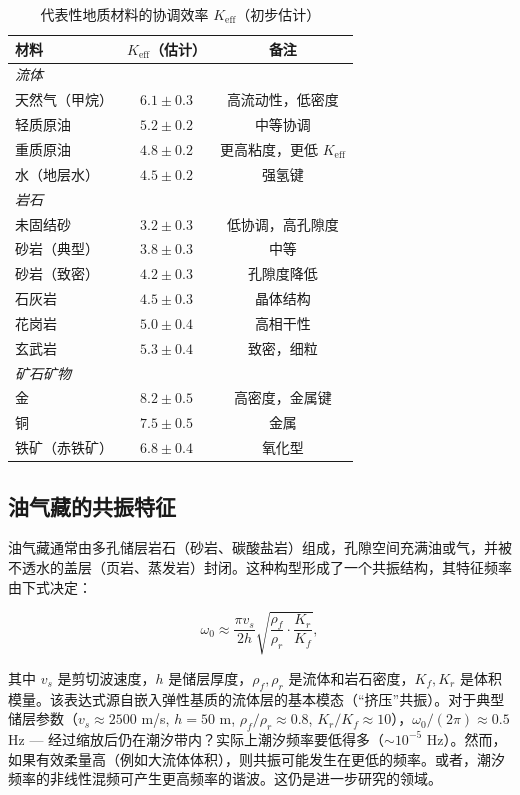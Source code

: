 \documentclass[12pt,a4paper]{article}
\theoremstyle{remark}
\newcommand{\Keff}{K_{\mathrm{eff}}}
\begin{document}
	\begin{table}[htbp]
		\centering
		\caption{代表性地质材料的协调效率 $\Keff$（初步估计）}
		\label{tab:keff-geology}
		\small
		\begin{tabular}{lcc}
			\toprule
			\textbf{材料} & \textbf{$\Keff$（估计）} & \textbf{备注} \\
			\midrule
			\multicolumn{3}{l}{\textit{流体}} \\
			天然气（甲烷） & $6.1 \pm 0.3$ & 高流动性，低密度 \\
			轻质原油 & $5.2 \pm 0.2$ & 中等协调 \\
			重质原油 & $4.8 \pm 0.2$ & 更高粘度，更低 $\Keff$ \\
			水（地层水） & $4.5 \pm 0.2$ & 强氢键 \\
			\hline
			\multicolumn{3}{l}{\textit{岩石}} \\
			未固结砂 & $3.2 \pm 0.3$ & 低协调，高孔隙度 \\
			砂岩（典型） & $3.8 \pm 0.3$ & 中等 \\
			砂岩（致密） & $4.2 \pm 0.3$ & 孔隙度降低 \\
			石灰岩 & $4.5 \pm 0.3$ & 晶体结构 \\
			花岗岩 & $5.0 \pm 0.4$ & 高相干性 \\
			玄武岩 & $5.3 \pm 0.4$ & 致密，细粒 \\
			\hline
			\multicolumn{3}{l}{\textit{矿石矿物}} \\
			金 & $8.2 \pm 0.5$ & 高密度，金属键 \\
			铜 & $7.5 \pm 0.5$ & 金属 \\
			铁矿（赤铁矿） & $6.8 \pm 0.4$ & 氧化型 \\
			\bottomrule
		\end{tabular}
	\end{table}
	
	\subsection{油气藏的共振特征}
	
	油气藏通常由多孔储层岩石（砂岩、碳酸盐岩）组成，孔隙空间充满油或气，并被不透水的盖层（页岩、蒸发岩）封闭。这种构型形成了一个共振结构，其特征频率由下式决定：
	
	\begin{equation}
		\omega_0 \approx \frac{\pi v_s}{2h} \sqrt{\frac{\rho_f}{\rho_r} \cdot \frac{K_r}{K_f}},
		\label{eq:resonant-frequency}
	\end{equation}
	
	其中 $v_s$ 是剪切波速度，$h$ 是储层厚度，$\rho_f, \rho_r$ 是流体和岩石密度，$K_f, K_r$ 是体积模量。该表达式源自嵌入弹性基质的流体层的基本模态（“挤压”共振）。对于典型储层参数（$v_s \approx 2500$ m/s, $h = 50$ m, $\rho_f/\rho_r \approx 0.8$, $K_r/K_f \approx 10$），$\omega_0/(2\pi) \approx 0.5$ Hz — 经过缩放后仍在潮汐带内？实际上潮汐频率要低得多（$\sim 10^{-5}$ Hz）。然而，如果有效柔量高（例如大流体体积），则共振可能发生在更低的频率。或者，潮汐频率的非线性混频可产生更高频率的谐波。这仍是进一步研究的领域。
	
\end{document}
